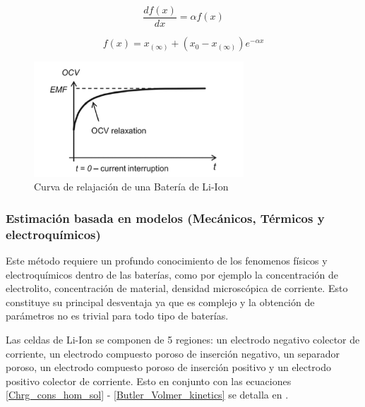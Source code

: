 \documentclass[10pt,a4paper]{article}
\begin{document}
    \begin{equation}
      \frac{df(x)}{dx} = \alpha f(x)
      \label{1er_orden_eq}
    \end{equation}  

    \begin{equation}
      f(x)= x_{(\infty)}+(x_0-x_{(\infty)})e^{-\alpha x}
      \label{1er_orden_sol}
    \end{equation}  
	
    \clearpage

	\begin{figure}[h]
		\begin{center}
			\includegraphics[width=0.7\textwidth]{EMF_Relaxation.png}
			\caption{Curva de relajación de una Batería de Li-Ion}
			\label{EMF_Method}
		\end{center}
	\end{figure}

	\subsubsection{Estimación basada en modelos (Mecánicos, Térmicos y electroquímicos)}

	Este método requiere un profundo conocimiento de los fenomenos físicos y electroquímicos dentro de las baterías, como por ejemplo la concentración de electrolito, concentración de material, densidad microscópica de corriente. Esto constituye su principal desventaja ya que es complejo y la obtención de parámetros no es trivial para todo tipo de baterías.
	
	Las celdas de Li-Ion se componen de 5 regiones: un electrodo negativo colector de corriente, un electrodo compuesto poroso de inserción negativo, un separador poroso, un electrodo compuesto poroso de inserción positivo y un electrodo positivo colector de corriente. Esto en conjunto con las ecuaciones \ref{Chrg_cons_hom_sol} - \ref{Butler_Volmer_kinetics} se detalla en \cite{Li2016}.
	
	
\end{document}
